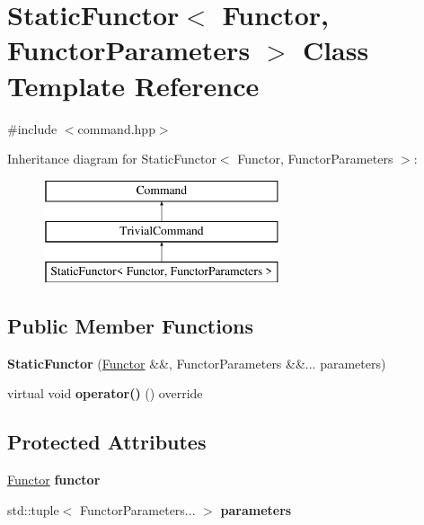 \hypertarget{class_static_functor}{}\section{Static\+Functor$<$ Functor, Functor\+Parameters $>$ Class Template Reference}
\label{class_static_functor}


{\ttfamily \#include $<$command.\+hpp$>$}

Inheritance diagram for Static\+Functor$<$ Functor, Functor\+Parameters $>$\+:\begin{figure}[H]
\begin{center}
\leavevmode
\includegraphics[height=3.000000cm]{class_static_functor}
\end{center}
\end{figure}
\subsection*{Public Member Functions}
\begin{DoxyCompactItemize}
\item 
\mbox{\label{class_static_functor_a5b9d8e265d36df933f9fbfb51d1edf32}} 
{\bfseries Static\+Functor} (\mbox{\hyperlink{class_functor}{Functor}} \&\&, Functor\+Parameters \&\&... parameters)
\item 
\mbox{\label{class_static_functor_a1d8fe0ec2f9965c5f95ad182a8df510b}} 
virtual void {\bfseries operator()} () override
\end{DoxyCompactItemize}
\subsection*{Protected Attributes}
\begin{DoxyCompactItemize}
\item 
\mbox{\label{class_static_functor_aea8563c235a2dea8474da84504c51b58}} 
\mbox{\hyperlink{class_functor}{Functor}} {\bfseries functor}
\item 
\mbox{\label{class_static_functor_aaa5d69cb0c000ea6c4846296de2c7f7f}} 
std\+::tuple$<$ Functor\+Parameters... $>$ {\bfseries parameters}
\end{DoxyCompactItemize}


